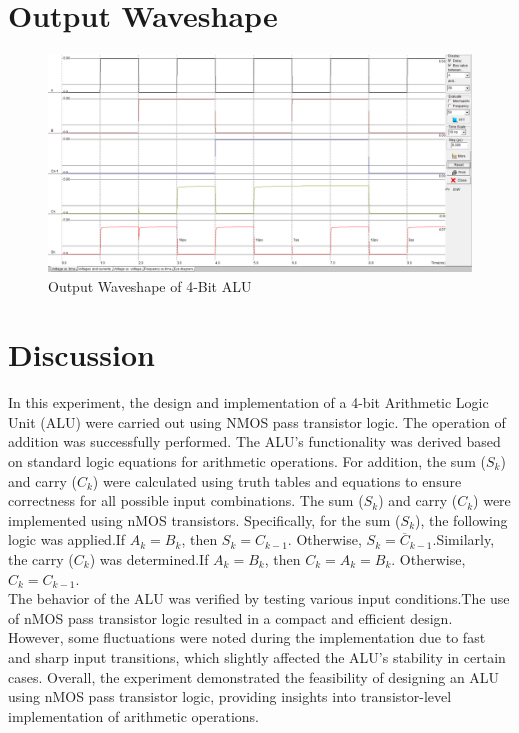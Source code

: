 \documentclass[a4paper,12pt]{article}
\begin{document}
	\section{Output Waveshape }
\begin{figure}[H]
	\centering
	\includegraphics[width=1\linewidth, height=0.45\textheight]{Images/w}
	\caption{Output Waveshape of 4-Bit ALU}
	\label{fig:1}
\end{figure}
\section{Discussion}

In this experiment, the design and implementation of a 4-bit Arithmetic Logic Unit (ALU) were carried out using NMOS pass transistor logic. The operation of addition was successfully performed.
The ALU's functionality was derived based on standard logic equations for arithmetic operations. For addition, the sum ($S_k$) and carry ($C_k$) were calculated using truth tables and equations to ensure correctness for all possible input combinations. The sum ($S_k$) and carry ($C_k$) were implemented using nMOS transistors. Specifically, for the sum ($S_k$), the following logic was applied.If $A_k = B_k$, then $S_k = C_{k-1}$.
 Otherwise, $S_k = \overline{C}_{k-1}$.Similarly, the carry ($C_k$) was determined.If $A_k = B_k$, then $C_k = A_k = B_k$.
 Otherwise, $C_k = C_{k-1}$.\\
The behavior of the ALU was verified by testing various input conditions.The use of nMOS pass transistor logic resulted in a compact and efficient design. However, some fluctuations were noted during the implementation due to fast and sharp input transitions, which slightly affected the ALU's stability in certain cases.
Overall, the experiment demonstrated the feasibility of designing an ALU using nMOS pass transistor logic, providing insights into transistor-level implementation of arithmetic operations.

	
\end{document}
